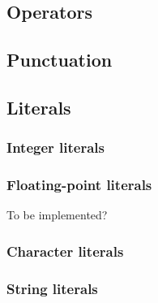 \documentclass{article}
\begin{document}
\subsection*{Operators}

\subsection*{Punctuation}

\subsection*{Literals}
\subsubsection*{Integer literals}
\subsubsection*{Floating-point literals}
To be implemented?
\subsubsection*{Character literals}
\subsubsection*{String literals}
\end{document}

